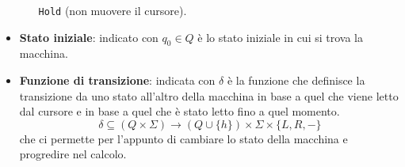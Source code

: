 \begin{definition}
\begin{itemize}
\begin{itemize}
			            \verb|Hold| (non muovere il cursore).
		      \end{itemize}
		\item \textbf{Stato iniziale}: indicato con $q_0 \in Q$
		      è lo stato iniziale in cui si trova la macchina.
		\item \textbf{Funzione di transizione}: indicata con
		      $\delta$ è la funzione che definisce la
		      transizione da uno stato all'altro della macchina
		      in base a quel che viene letto dal cursore e in
		      base a quel che è stato letto fino a quel momento.
		      \[
			      \delta \subseteq (Q \times \Sigma) \to
			      (Q \cup \{ h \}) \times \Sigma \times
			      \{ L, R, - \}
		      \]
		      che ci permette per l'appunto di cambiare lo
		      stato della macchina e progredire nel calcolo.
	\end{itemize}
\end{definition}
